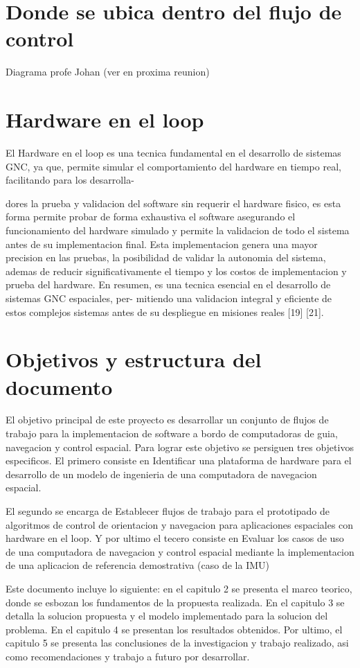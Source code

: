 \section{Donde se ubica dentro del flujo de control}
Diagrama profe Johan (ver en proxima reunion)

\section{Hardware en el loop}
El Hardware en el loop es una tecnica fundamental en el desarrollo de sistemas GNC, ya que,
permite simular el comportamiento del hardware en tiempo real, facilitando para los desarrolla-

dores la prueba y validacion del software sin requerir el hardware fisico, es esta forma permite
probar de forma exhaustiva el software asegurando el funcionamiento del hardware simulado y
permite la validacion de todo el sistema antes de su implementacion final. Esta implementacion
genera una mayor precision en las pruebas, la posibilidad de validar la autonomia del sistema,
ademas de reducir significativamente el tiempo y los costos de implementacion y prueba del
hardware. En resumen, es una tecnica esencial en el desarrollo de sistemas GNC espaciales, per-
mitiendo una validacion integral y eficiente de estos complejos sistemas antes de su despliegue
en misiones reales [19] [21].



\section{Objetivos y estructura del documento}


El objetivo principal de este proyecto es desarrollar un conjunto de flujos de trabajo para la implementacion de software a bordo de
computadoras de guia, navegacion y control espacial. Para lograr este objetivo se persiguen tres objetivos
especificos. El primero consiste en Identificar una plataforma de hardware para el desarrollo de un modelo de ingenieria de
una computadora de navegacion espacial.

El segundo se encarga de Establecer flujos de trabajo para el prototipado de algoritmos de control de orientacion
y navegacion para aplicaciones espaciales con hardware en el loop. Y por ultimo el tecero consiste en Evaluar los casos de uso de una computadora de navegacion y control espacial mediante
la implementacion de una aplicacion de referencia demostrativa (caso de la IMU)


Este documento incluye lo siguiente: en el capitulo 2 se presenta el marco teorico, donde se
esbozan los fundamentos de la propuesta realizada. En el capitulo 3 se detalla la solucion
propuesta y el modelo implementado para la solucion del problema. En el capitulo 4 se
presentan los resultados obtenidos. Por ultimo, el capitulo 5 se presenta las conclusiones
de la investigacion y trabajo realizado, asi como recomendaciones y trabajo a futuro por
desarrollar.

